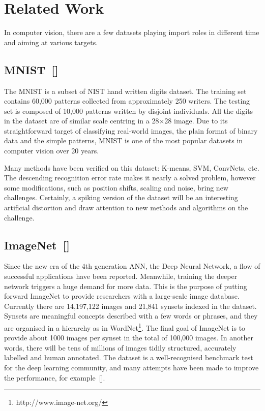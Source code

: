 \section{Related Work}
\label{sec:Related}
In computer vision, there are a few datasets playing import roles in different time and aiming at various targets.
\subsection{MNIST~[\cite{lecun_gradient-based_1998}]}
The MNIST is a subset of NIST hand written digits dataset. 
The training set contains 60,000 patterns collected from approximately 250 writers.
The testing set is composed of 10,000 patterns written by disjoint individuals.
All the digits in the dataset are of similar scale centring in a 28$ \times $28 image.
Due to its straightforward target of classifying real-world images, the plain format of binary data and the simple patterns, MNIST is one of the most popular datasets in computer vision over 20 years.

Many methods have been verified on this dataset: K-means, SVM, ConvNets, etc.
The descending recognition error rate makes it nearly a solved problem, however some modifications, such as position shifts, scaling and noise, bring new challenges.
Certainly, a spiking version of the dataset will be an interesting artificial distortion and draw attention to new methods and algorithms on the challenge. 

\subsection{ImageNet~[\cite{deng_imagenet:_2009}]}
Since the new era of the 4th generation ANN, the Deep Neural Network, a flow of successful applications have been reported.
Meanwhile, training the deeper network triggers a huge demand for more data.
This is the purpose of putting forward ImageNet to provide researchers with a large-scale image database.
Currently there are 14,197,122 images and 21,841 synsets indexed in the dataset.
Synsets are meaningful concepts described with a few words or phrases, and they are organised in a hierarchy as in WordNet\footnote{http://www.image-net.org/}.
The final goal of ImageNet is to provide about 1000 images per synset in the total of 100,000 images.
In another words, there will be tens of millions of images tidily structured, accurately labelled and human annotated.
The dataset is a well-recognised benchmark test for the deep learning community, and many attempts have been made to improve the performance, for example~[\cite{krizhevsky2012imagenet}].

